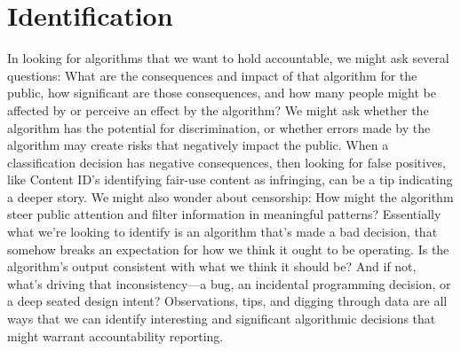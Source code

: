 \section{Identification}
In looking for algorithms that we want to hold accountable, we might ask several questions: What are the consequences and impact of that algorithm for the public, how significant are those consequences, and how many people might be affected by or perceive an effect by the algorithm? We might ask whether the algorithm has the potential for discrimination, or whether errors made by the algorithm may create risks that negatively impact the public. When a classification decision has negative consequences, then looking for false positives, like Content ID's identifying fair-use content as infringing, can be a tip indicating a deeper story. We might also wonder about censorship: How might the algorithm steer public attention and filter information in meaningful patterns? 
Essentially what we're looking to identify is an algorithm that's made a bad decision, that somehow breaks an expectation for how we think it ought to be operating. Is the algorithm's output consistent with what we think it should be? And if not, what's driving that inconsistency—a bug, an incidental programming decision, or a deep seated design intent? Observations, tips, and digging through data are all ways that we can identify interesting and significant algorithmic decisions that might warrant accountability reporting.
